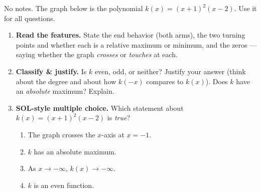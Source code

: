 \documentclass[10pt]{article}
\newcommand{\lgrid}[4]{%
  \draw[step=1, linegray!40, very thin] (#1,#3) grid (#2,#4);
  \draw[->, semithick, charcoal] (#1,0)--(#2,0) node[below right, font=\scriptsize]{$x$};
  \draw[->, semithick, charcoal] (0,#3)--(0,#4) node[left, font=\scriptsize]{$y$};}
\begin{document}
\namedateperiod

\vspace{0.10in}

No notes. The graph below is the polynomial $k(x) = (x+1)^2(x-2)$. Use it for all questions.
\begin{center}
\end{center}

\begin{enumerate}[leftmargin=1.8em, itemsep=9pt]
  \item \textbf{Read the features.} State the end behavior (both arms), the two turning points and
        whether each is a relative maximum or minimum, and the zeros --- saying whether the graph
        \emph{crosses} or \emph{touches} at each.
  \item \textbf{Classify \& justify.} Is $k$ even, odd, or neither? Justify your answer (think about
        the degree and about how $k(-x)$ compares to $k(x)$). Does $k$ have an \emph{absolute}
        maximum? Explain.
  \item \textbf{SOL-style multiple choice.} Which statement about $k(x)=(x+1)^2(x-2)$ is \emph{true}?
        \begin{enumerate}[label=\Alph*., leftmargin=1.9em, itemsep=1pt]
          \item The graph crosses the $x$-axis at $x=-1$.
          \item $k$ has an absolute maximum.
          \item As $x\to-\infty$, $k(x)\to-\infty$.
          \item $k$ is an even function.
        \end{enumerate}
\end{enumerate}
\end{document}
